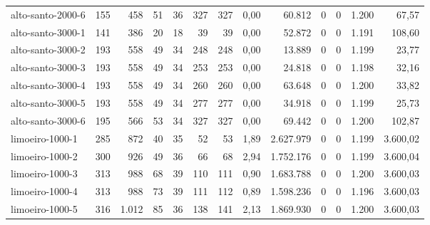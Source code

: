 \begin{table}[ht!]
{\begin{tabular}{lrrrrrrrrrrrr}
			\rowcolor{rowgrey}alto-santo-2000-6                                                       & 155 & 458   & 51  & 36 & 327 & 327 & 0,00  & 60.812    & 0 & 0 & 1.200 & 67,57    \\
			\rowcolor{rowgrey}alto-santo-3000-1                                                       & 141 & 386   & 20  & 18 & 39  & 39  & 0,00  & 52.872    & 0 & 0 & 1.191 & 108,60   \\
			\rowcolor{rowgrey}alto-santo-3000-2                                                       & 193 & 558   & 49  & 34 & 248 & 248 & 0,00  & 13.889    & 0 & 0 & 1.199 & 23,77    \\
			\rowcolor{rowgrey}alto-santo-3000-3                                                       & 193 & 558   & 49  & 34 & 253 & 253 & 0,00  & 24.818    & 0 & 0 & 1.198 & 32,16    \\
			\rowcolor{rowgrey}alto-santo-3000-4                                                       & 193 & 558   & 49  & 34 & 260 & 260 & 0,00  & 63.648    & 0 & 0 & 1.200 & 33,82    \\
			\rowcolor{rowgrey}alto-santo-3000-5                                                       & 193 & 558   & 49  & 34 & 277 & 277 & 0,00  & 34.918    & 0 & 0 & 1.199 & 25,73    \\
			\rowcolor{rowgrey}alto-santo-3000-6                                                       & 195 & 566   & 53  & 34 & 327 & 327 & 0,00  & 69.442    & 0 & 0 & 1.200 & 102,87   \\
			\midrule
			\rowcolor{rowlight}limoeiro-1000-1                                                        & 285 & 872   & 40  & 35 & 52  & 53  & 1,89  & 2.627.979 & 0 & 0 & 1.199 & 3.600,02 \\
			\rowcolor{rowlight}limoeiro-1000-2                                                        & 300 & 926   & 49  & 36 & 66  & 68  & 2,94  & 1.752.176 & 0 & 0 & 1.199 & 3.600,04 \\
			\rowcolor{rowlight}limoeiro-1000-3                                                        & 313 & 988   & 68  & 39 & 110 & 111 & 0,90  & 1.683.788 & 0 & 0 & 1.200 & 3.600,03 \\
			\rowcolor{rowlight}limoeiro-1000-4                                                        & 313 & 988   & 73  & 39 & 111 & 112 & 0,89  & 1.598.236 & 0 & 0 & 1.196 & 3.600,03 \\
			\rowcolor{rowlight}limoeiro-1000-5                                                        & 316 & 1.012 & 85  & 36 & 138 & 141 & 2,13  & 1.869.930 & 0 & 0 & 1.200 & 3.600,03 \\

\end{tabular}}
\end{table}
